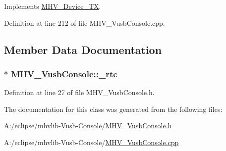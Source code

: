 \-Implements \hyperlink{class_m_h_v___device___t_x_a3a86067d417c3d5a1f64042ecfcefff7}{\-M\-H\-V\-\_\-\-Device\-\_\-\-T\-X}.



\-Definition at line 212 of file \-M\-H\-V\-\_\-\-Vusb\-Console.\-cpp.



\subsection{\-Member \-Data \-Documentation}
\hypertarget{class_m_h_v___vusb_console_a185c110b91f513e6588534b0e8a0a221}{
\subsubsection[{\-\_\-rtc}]{$\ast$ {\bf \-M\-H\-V\-\_\-\-Vusb\-Console\-::\-\_\-rtc}}}
\label{class_m_h_v___vusb_console_a185c110b91f513e6588534b0e8a0a221}


\-Definition at line 27 of file \-M\-H\-V\-\_\-\-Vusb\-Console.\-h.



\-The documentation for this class was generated from the following files\-:\begin{DoxyCompactItemize}
\item 
\-A\-:/eclipse/mhvlib-\/\-Vusb-\/\-Console/\hyperlink{_m_h_v___vusb_console_8h}{\-M\-H\-V\-\_\-\-Vusb\-Console.\-h}\item 
\-A\-:/eclipse/mhvlib-\/\-Vusb-\/\-Console/\hyperlink{_m_h_v___vusb_console_8cpp}{\-M\-H\-V\-\_\-\-Vusb\-Console.\-cpp}\end{DoxyCompactItemize}
